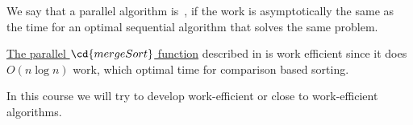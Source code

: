 \begin{flex}
\label{grp:def:intro::intro::work-efficiency}

\begin{definition}
\label{def:intro::intro::work-efficiency}
We say that a parallel algorithm is~, if the work is asymptotically the same as the time for
an optimal sequential algorithm that solves the same problem.

\end{definition}

\begin{example}
\label{xmpl:introduction::parallelism::intro}
\href{ex:intro::intro::mergesort-cost}{The parallel $\cd{mergeSort}$ function} described in is work efficient since it does $O(n \log n)$ work, which optimal time for comparison based sorting. 

In this course we will try to develop work-efficient or close to work-efficient algorithms.

\end{example}
\end{flex}


